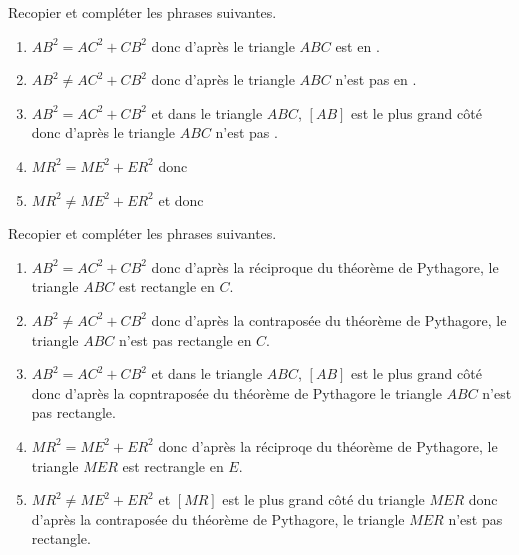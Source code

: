 \begin{exercice*}
    Recopier et compléter les phrases suivantes.
    \begin{enumerate}
        \item $AB^2=AC^2+CB^2$ donc d'après \makebox[0.1\linewidth]{\dotfill} le triangle $ABC$ est \makebox[0.1\linewidth]{\dotfill} en \makebox[0.1\linewidth]{\dotfill}.
        \item $AB^2\neq AC^2+CB^2$ donc d'après \makebox[0.1\linewidth]{\dotfill} le triangle $ABC$ n'est pas \makebox[0.1\linewidth]{\dotfill} en \makebox[0.1\linewidth]{\dotfill}.
        \item $AB^2=AC^2+CB^2$ et dans le triangle $ABC$, $[AB]$ est le plus grand côté donc d'après \makebox[0.1\linewidth]{\dotfill} le triangle $ABC$ n'est pas \makebox[0.1\linewidth]{\dotfill}.
        \item $MR^2=ME^2+ER^2$ donc \makebox[0.1\linewidth]{\dotfill}
        \item $MR^2\neq ME^2+ER^2$ et \makebox[0.1\linewidth]{\dotfill} donc \makebox[0.1\linewidth]{\dotfill}
    \end{enumerate}    
\end{exercice*}
\begin{corrige}
    Recopier et compléter les phrases suivantes.

    \begin{enumerate}
        \item $AB^2=AC^2+CB^2$ donc d'après {\red la réciproque du théorème de Pythagore,} le triangle $ABC$ est {\red rectangle} en {\red $C$}.
        \item $AB^2\neq AC^2+CB^2$ donc d'après {\red la contraposée du théorème de Pythagore,} le triangle $ABC$ n'est pas {\red rectangle} en {\red $C$}.
    \end{enumerate}
    \Coupe
    \begin{enumerate}
        \setcounter{enumi}{2}
        \item $AB^2=AC^2+CB^2$ et dans le triangle $ABC$, $[AB]$ est le plus grand côté donc d'après {\red la copntraposée du théorème de Pythagore} le triangle $ABC$ n'est pas {\red rectangle}.
        \item $MR^2=ME^2+ER^2$ donc {\red d'après la réciproqe du théorème de Pythagore, le triangle $MER$ est rectrangle en $E$.}
        \item $MR^2\neq ME^2+ER^2$ et {\red $[MR]$ est le plus grand côté du triangle $MER$} donc {\red d'après la contraposée du théorème de Pythagore, le triangle $MER$ n'est pas rectangle.}
    \end{enumerate}
\end{corrige}

